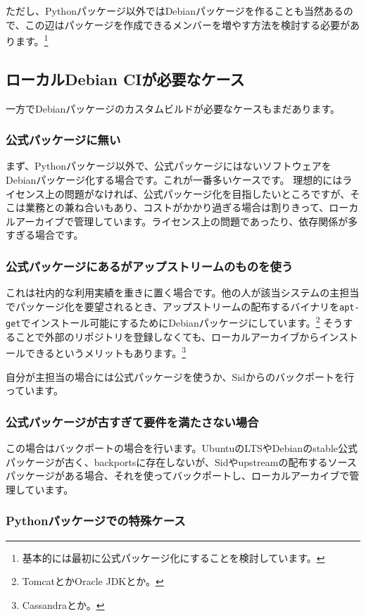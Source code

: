 \documentclass[mingoth,a4paper]{jsarticle}
\begin{document}
ただし、Pythonパッケージ以外ではDebianパッケージを作ることも当然あるので、この辺はパッケージを作成できるメンバーを増やす方法を検討する必要があります。\footnote{基本的には最初に公式パッケージ化にすることを検討しています。}

\subsection{ローカルDebian CIが必要なケース}
一方でDebianパッケージのカスタムビルドが必要なケースもまだあります。

\subsubsection{公式パッケージに無い}
まず、Pythonパッケージ以外で、公式パッケージにはないソフトウェアをDebianパッケージ化する場合です。これが一番多いケースです。
理想的にはライセンス上の問題がなければ、公式パッケージ化を目指したいところですが、そこは業務との兼ね合いもあり、コストがかかり過ぎる場合は割りきって、ローカルアーカイブで管理しています。ライセンス上の問題であったり、依存関係が多すぎる場合です。

\subsubsection{公式パッケージにあるがアップストリームのものを使う}

これは社内的な利用実績を重きに置く場合です。他の人が該当システムの主担当でパッケージ化を要望されるとき、アップストリームの配布するバイナリを\texttt{apt-get}でインストール可能にするためにDebianパッケージにしています。\footnote{TomcatとかOracle JDKとか。}
そうすることで外部のリポジトリを登録しなくても、ローカルアーカイブからインストールできるというメリットもあります。\footnote{Cassandraとか。}

自分が主担当の場合には公式パッケージを使うか、Sidからのバックポートを行っています。

\subsubsection{公式パッケージが古すぎて要件を満たさない場合}

この場合はバックポートの場合を行います。UbuntuのLTSやDebianのstable公式パッケージが古く、backportsに存在しないが、Sidやupstreamの配布するソースパッケージがある場合、それを使ってバックポートし、ローカルアーカイブで管理しています。

\subsubsection{Pythonパッケージでの特殊ケース}
\end{document}
